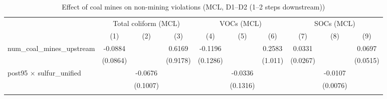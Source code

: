 
\begin{table}[htbp]
   
   \caption{\label{2sls_4step_d1_d2_nonminevio_mcl} Effect of coal mines on non-mining violations (MCL, D1--D2 (1--2 steps downstream))}
   \bigskip
   
   \centering
   
   \begin{adjustbox}{width = \textwidth, center}
      
      
      \begin{tabular}{lccccccccc}
         \toprule
         
          & \multicolumn{3}{c}{Total coliform (MCL)} & \multicolumn{3}{c}{VOCs (MCL)} & \multicolumn{3}{c}{SOCs (MCL)}\\
         
                                                           & (1)           & (2)           & (3)           & (4)           & (5)                   & (6)                   & (7)           & (8)                   & (9)\\  
         
         \midrule 
         num\_coal\_mines\_upstream                        & -0.0884       &               & 0.6169        & -0.1196       &                       & 0.2583                & 0.0331        &                       & 0.0697\\   
                                                           & (0.0864)      &               & (0.9178)      & (0.1286)      &                       & (1.011)               & (0.0267)      &                       & (0.0515)\\   
         post95 $\times$ sulfur\_unified                   &               & -0.0676       &               &               & -0.0336               &                       &               & -0.0107               &   \\   
                                                           &               & (0.1007)      &               &               & (0.1316)              &                       &               & (0.0076)              &   \\   
         
          \\
         

\end{tabular}
\end{adjustbox}
\end{table}
